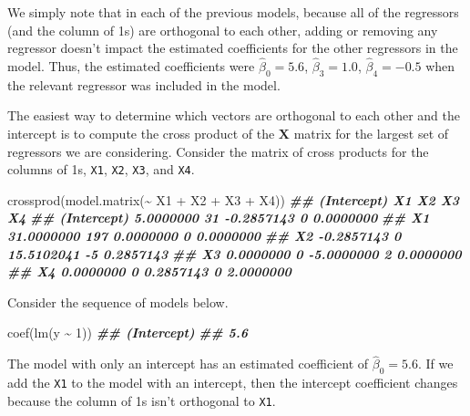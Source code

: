 \documentclass[
]{book}
\newenvironment{Shaded}{\begin{snugshade}}{\end{snugshade}}
\newcommand{\DecValTok}[1]{\textcolor[rgb]{0.00,0.00,0.81}{#1}}
\newcommand{\DocumentationTok}[1]{\textcolor[rgb]{0.56,0.35,0.01}{\textbf{\textit{#1}}}}
\newcommand{\FunctionTok}[1]{\textcolor[rgb]{0.00,0.00,0.00}{#1}}
\newcommand{\NormalTok}[1]{#1}
\newcommand{\SpecialCharTok}[1]{\textcolor[rgb]{0.00,0.00,0.00}{#1}}
\theoremstyle{definition}
\theoremstyle{definition}
\theoremstyle{definition}
\theoremstyle{definition}
\theoremstyle{remark}
\begin{document}
We simply note that in each of the previous models, because all of the
regressors (and the column of 1s) are orthogonal to each other, adding
or removing any regressor doesn't impact the estimated coefficients for
the other regressors in the model. Thus, the estimated coefficients were
\(\hat{\beta}_{0}=5.6\), \(\hat{\beta}_{3}=1.0\), \(\hat{\beta}_{4}=-0.5\)
when the relevant regressor was included in the model.

The easiest way to determine which vectors are orthogonal to each other
and the intercept is to compute the cross product of the \(\mathbf{X}\)
matrix for the largest set of regressors we are considering. Consider
the matrix of cross products for the columns of 1s, \texttt{X1}, \texttt{X2}, \texttt{X3}, and
\texttt{X4}.

\begin{Shaded}
\begin{Highlighting}[]
\FunctionTok{crossprod}\NormalTok{(}\FunctionTok{model.matrix}\NormalTok{(}\SpecialCharTok{\textasciitilde{}}\NormalTok{ X1 }\SpecialCharTok{+}\NormalTok{ X2 }\SpecialCharTok{+}\NormalTok{ X3 }\SpecialCharTok{+}\NormalTok{ X4))}
\DocumentationTok{\#\#             (Intercept)  X1         X2 X3        X4}
\DocumentationTok{\#\# (Intercept)   5.0000000  31 {-}0.2857143  0 0.0000000}
\DocumentationTok{\#\# X1           31.0000000 197  0.0000000  0 0.0000000}
\DocumentationTok{\#\# X2           {-}0.2857143   0 15.5102041 {-}5 0.2857143}
\DocumentationTok{\#\# X3            0.0000000   0 {-}5.0000000  2 0.0000000}
\DocumentationTok{\#\# X4            0.0000000   0  0.2857143  0 2.0000000}
\end{Highlighting}
\end{Shaded}

Consider the sequence of models below.

\begin{Shaded}
\begin{Highlighting}[]
\FunctionTok{coef}\NormalTok{(}\FunctionTok{lm}\NormalTok{(y }\SpecialCharTok{\textasciitilde{}} \DecValTok{1}\NormalTok{))}
\DocumentationTok{\#\# (Intercept) }
\DocumentationTok{\#\#         5.6}
\end{Highlighting}
\end{Shaded}

The model with only an intercept has an estimated coefficient of
\(\hat{\beta}_{0}=5.6\). If we add the \texttt{X1} to the model with an
intercept, then the intercept coefficient changes because the column of 1s isn't orthogonal to \texttt{X1}.
\end{document}
